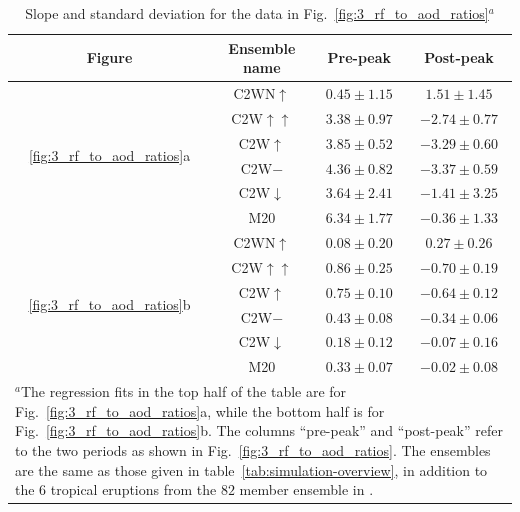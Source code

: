 \documentclass[draft]{agujournal2019}
\begin{document}
  \begin{table}
    \centering

    \caption{Slope and standard deviation for the data in
      Fig.~\ref{fig:3_rf_to_aod_ratios}\(^{a}\)}\label{tab:slope-gradients}%
    \begin{tabular}{cccc}
      \toprule
      Figure & Ensemble name & Pre-peak & Post-peak \\
      \midrule
      & C2WN\(\uparrow\) & \(0.45\pm1.15\) & \(1.51\pm1.45\) \\
      & C2W\(\uparrow\uparrow\) & \(3.38\pm0.97\) & \(-2.74\pm0.77\) \\
      \multirow{2}{*}{\ref{fig:3_rf_to_aod_ratios}a} & C2W\(\uparrow\) & \(3.85\pm0.52\) & \(-3.29\pm0.60\) \\
      & C2W\(-\) & \(4.36\pm0.82\) & \(-3.37\pm0.59\) \\
      & C2W\(\downarrow\) & \(3.64\pm2.41\) & \(-1.41\pm3.25\) \\
      & M20 & \(6.34\pm1.77\) & \(-0.36\pm1.33\) \\
      \midrule
      & C2WN\(\uparrow\) & \(0.08\pm0.20\) & \(0.27\pm0.26\) \\
      & C2W\(\uparrow\uparrow\) & \(0.86\pm0.25\) & \(-0.70\pm0.19\) \\
      \multirow{2}{*}{\ref{fig:3_rf_to_aod_ratios}b} & C2W\(\uparrow\) & \(0.75\pm0.10\) & \(-0.64\pm0.12\) \\
      & C2W\(-\) & \(0.43\pm0.08\) & \(-0.34\pm0.06\) \\
      & C2W\(\downarrow\) & \(0.18\pm0.12\) & \(-0.07\pm0.16\) \\
      & M20 & \(0.33\pm0.07\) & \(-0.02\pm0.08\) \\
      \toprule
      \multicolumn{4}{l}{\parbox{\linewidth}{\(^{a}\)The regression fits in the top half of the table are for
          Fig.~\ref{fig:3_rf_to_aod_ratios}a, while the bottom half is for
          Fig.~\ref{fig:3_rf_to_aod_ratios}b. The columns ``pre-peak'' and ``post-peak'' refer to
          the two periods as shown in Fig.~\ref{fig:3_rf_to_aod_ratios}. The ensembles are the
          same as those given in table~\ref{tab:simulation-overview}, in addition to the \(6\)
          tropical eruptions from the \(82\) member ensemble in
          .}} \\
    \end{tabular}
  \end{table}
\end{document}
